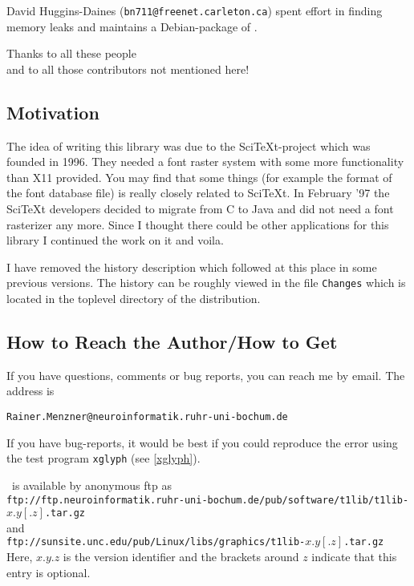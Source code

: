 David Huggins-Daines (\verb+bn711@freenet.carleton.ca+) spent effort in
finding memory leaks and maintains a Debian-package of \tonelib.


\begin{center}
  \Large Thanks to all these people \\
  and to all those contributors not mentioned here! 
\end{center}

\subsection{Motivation}
The idea of writing this library was due to the SciTeXt-project which
was founded in 1996. They needed a font raster system with some more
functionality than X11 provided. You may find that some things (for
example the format of the font database file) is really closely
related to SciTeXt. In February '{}97 the SciTeXt developers decided to
migrate from C to Java and did not need a font rasterizer any more. Since I
thought there could be other applications for this library I continued the
work on it and voila. 

I have removed the history description which followed at this place in some
previous versions. The history can be roughly viewed in the file \verb+Changes+
which is located in the toplevel directory of the distribution.


\subsection{How to Reach the Author/How to Get \tonelib}
If you have questions, comments or bug reports, you can reach me by
email. The address is 
\begin{center}
\verb+Rainer.Menzner@neuroinformatik.ruhr-uni-bochum.de+
\end{center}
If you have bug-reports, it would be best if you could reproduce the error
using the test program \verb+xglyph+ (see \ref{xglyph}). 

\tonelib\ is available by anonymous ftp as\\[5mm]
\verb+ftp://ftp.neuroinformatik.ruhr-uni-bochum.de/pub/software/t1lib/t1lib-+$x.y[.z]$\verb+.tar.gz+ 
\\[5mm]
and \\[5mm]
\verb+ftp://sunsite.unc.edu/pub/Linux/libs/graphics/t1lib-+$x.y[.z]$\verb+.tar.gz+
\\[5mm]
Here, $x.y.z$ is the version identifier and the brackets around $z$ indicate
that this entry is optional.

